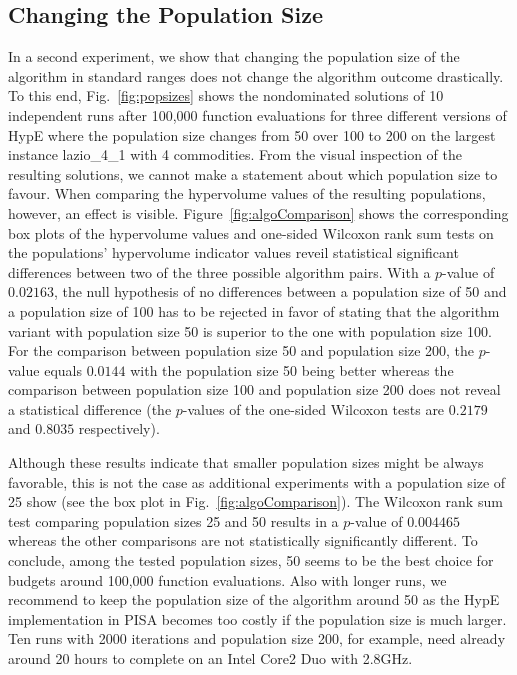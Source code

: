 \documentclass[preprint,12pt]{elsarticle}
\begin{document}
\subsection{Changing the Population Size}
In a second experiment, we show that changing the population size of the algorithm in standard ranges does not change the algorithm outcome drastically. To this end, Fig.~\ref{fig:popsizes} shows the nondominated solutions of 10 independent runs after 100,000 function evaluations for three different versions of HypE where the population size changes from 50 over 100 to 200 on the largest instance lazio\_4\_1 with 4 commodities. From the visual inspection of the resulting solutions, we cannot make a statement about which population size to favour. When comparing the hypervolume values of the resulting populations, however, an effect is visible. Figure~\ref{fig:algoComparison} shows the corresponding box plots of the hypervolume values and one-sided Wilcoxon rank sum tests on the populations' hypervolume indicator values reveil statistical significant differences between two of the three possible algorithm pairs. With a $p$-value of $0.02163$, the null hypothesis of no differences between a population size of 50 and a population size of 100 has to be rejected in favor of stating that the algorithm variant with population size 50 is superior to the one with population size 100. For the comparison between population size 50 and population size 200, the $p$-value equals $0.0144$ with the population size 50 being better whereas the comparison between population size 100 and population size 200 does not reveal a statistical difference (the $p$-values of the one-sided Wilcoxon tests are $0.2179$ and $0.8035$ respectively). 

Although these results indicate that smaller population sizes might be always favorable, this is not the case as additional experiments with a population size of 25 show (see the box plot in Fig.~\ref{fig:algoComparison}). The Wilcoxon rank sum test comparing population sizes 25 and 50 results in a $p$-value of $0.004465$ whereas the other comparisons are not statistically significantly different. To conclude, among the tested population sizes, 50 seems to be the best choice for budgets around 100,000 function evaluations. Also with longer runs, we recommend to keep the population size of the algorithm around 50 as the HypE implementation in PISA becomes too costly if the population size is much larger. Ten runs with 2000 iterations and population size 200, for example, need already around 20 hours to complete on an Intel Core2 Duo with 2.8GHz.
\end{document}
